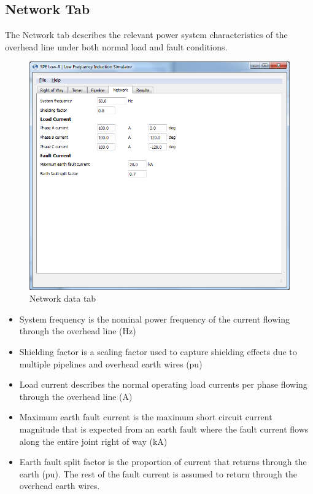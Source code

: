 \documentclass{article}
\begin{document}
\subsection{Network Tab}
The Network tab describes the relevant power system characteristics of the overhead line under both normal load and fault conditions.

\begin{figure}[!htp]
\begin{center}
\caption{Network data tab}
\label{fig:network}
\includegraphics[width=0.9\linewidth]{./Figures/network.png}
\end{center}
\end{figure}

\begin{itemize}
\item System frequency is the nominal power frequency of the current flowing through the overhead line (Hz)
\item Shielding factor is a scaling factor used to capture shielding effects due to multiple pipelines and overhead earth wires (pu)
\item Load current describes the normal operating load currents per phase flowing through the overhead line (A)
\item Maximum earth fault current is the maximum short circuit current magnitude that is expected from an earth fault where the fault current flows along the entire joint right of way (kA)
\item Earth fault split factor is the proportion of current that returns through the earth (pu). The rest of the fault current is assumed to return through the overhead earth wires.

\end{itemize}
\end{document}
